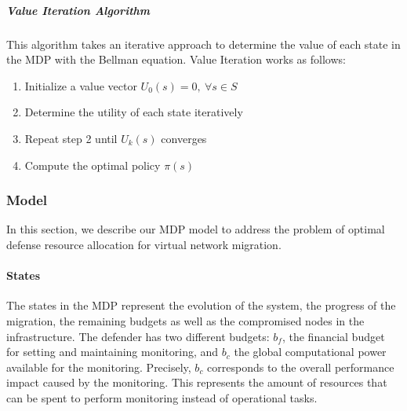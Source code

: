 \subparagraph{Value Iteration Algorithm}
This algorithm takes an iterative approach to determine the value of each state in the MDP with the Bellman equation.
Value Iteration works as follows:
\begin{enumerate}
    \item Initialize a value vector $U_0(s)=0,~\forall s\in S$
    \item Determine the utility of each state iteratively\\
    \item Repeat step 2 until $U_{k}(s)$ converges
    \item Compute the optimal policy $\pi(s)$\\ 
\end{enumerate}

\subsubsection{Model}
\label{sec:model}
In this section, we describe our MDP model to address the problem of optimal defense resource allocation for virtual network migration.

\paragraph{States}
\label{sec:stateset}
The states in the MDP represent the evolution of the system, the progress of the migration, the remaining budgets as well as the compromised nodes in the infrastructure.
The defender has two different budgets: $b_f$, the financial budget for setting and maintaining monitoring, and $b_c$ the global computational power available for the monitoring.
Precisely, $b_c$ corresponds to the overall performance impact caused by the monitoring. %
 This represents the amount of resources that can be spent to perform monitoring instead of operational tasks.


